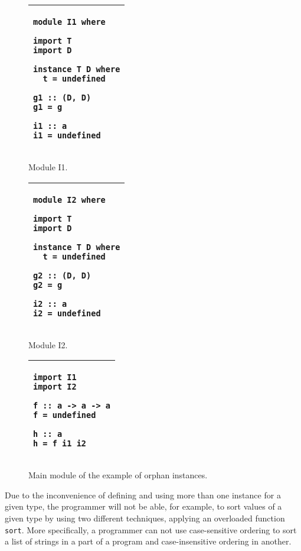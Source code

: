 \documentclass[msc]{ppgccufmg}
\begin{document}
\begin{figure}
\caption{Module I1.\label{I1}}
\begin{tabular}{|p{\textwidth}|}
\hline
\begin{verbatim}
module I1 where

import T
import D

instance T D where
  t = undefined

g1 :: (D, D)
g1 = g

i1 :: a
i1 = undefined
\end{verbatim}
\\
\hline
\end{tabular}
\end{figure}

\begin{figure}
\caption{Module I2.\label{I2}}
\begin{tabular}{|p{\textwidth}|}
\hline
\begin{verbatim}
module I2 where

import T
import D

instance T D where
  t = undefined

g2 :: (D, D)
g2 = g

i2 :: a
i2 = undefined
\end{verbatim}
\\
\hline
\end{tabular}
\end{figure}

\begin{figure}
\caption{Main module of the example of orphan instances.\label{main}}
\begin{tabular}{|p{\textwidth}|}
\hline
\begin{verbatim}
import I1
import I2

f :: a -> a -> a
f = undefined

h :: a
h = f i1 i2
\end{verbatim}
\\
\hline
\end{tabular}
\end{figure}

Due to the inconvenience of defining and using more than one instance for a given type,
the programmer will not be able, for example, to sort values of a given type by using two
different techniques, applying an overloaded function \texttt{sort}.  More specifically, a
programmer can not use case-sensitive ordering to sort a list of strings in a part of a
program and case-insensitive ordering in another.
\end{document}
